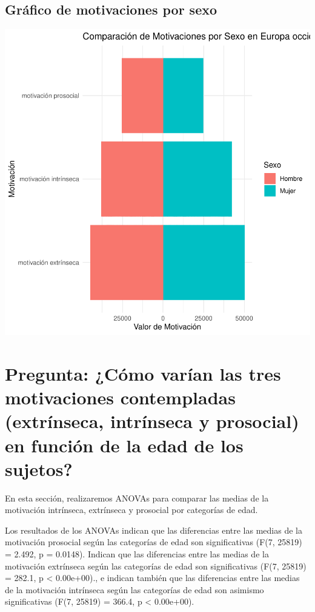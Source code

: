 \documentclass{article}
\begin{document}
\subsection{Gráfico de motivaciones por sexo}

\includegraphics{Ejemplo-004}



\section{Pregunta: ¿Cómo varían las tres motivaciones contempladas (extrínseca, intrínseca y prosocial) en función de la edad de los sujetos?}

En esta sección, realizaremos ANOVAs para comparar las medias de la motivación intrínseca, extrínseca y prosocial por categorías de edad.


Los resultados de los ANOVAs indican que las diferencias entre las medias de la motivación prosocial según las categorías de edad son significativas (F(7, 25819) = 2.492, p = 0.0148). Indican que las diferencias entre las medias de la motivación extrínseca según las categorías de edad son significativas (F(7, 25819) = 282.1, p < 0.00e+00)., e indican también que las diferencias entre las medias de la motivación intrínseca según las categorías de edad son asimismo significativas (F(7, 25819) = 366.4, p < 0.00e+00).
\end{document}
